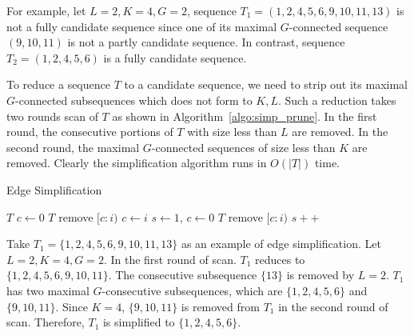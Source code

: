 For example, let $L = 2, K = 4, G = 2$, sequence $T_1=(1,2,4,5,6,9,10,11,13)$ is 
not a fully candidate sequence since one of its maximal $G$-connected sequence $(9,10,11)$
is not a partly candidate sequence. In contrast, sequence $T_2=(1,2,4,5,6)$ is 
a fully candidate sequence.

To reduce a sequence $T$ to a candidate sequence, we need to strip out its 
maximal $G$-connected subsequences which does not form to $K,L$. Such a reduction
takes two rounds scan of $T$ as shown in Algorithm~\ref{algo:simp_prune}. In the 
first round, the consecutive portions of $T$ with size less than $L$ are removed.
In the second round, the maximal $G$-connected sequences of size less than $K$ are
removed. Clearly the simplification algorithm runs in $O(|T|)$ time.
\begin{algorithm}
\caption{Edge Simplification}
\label{algo:simp_prune}
\begin{algorithmic}[1]
\Require $T$
\State $c \gets 0$
			\State $T$ remove $[c:i)$
		\EndIf
		\State $c \gets i$
	\EndIf
\EndFor
{}
\State $s\gets 1$, $c\gets 0$
			\State $T$ remove $[c:i)$
		\EndIf
	\Else
		\State $s++$
	\EndIf
\EndFor
\end{algorithmic}
\end{algorithm}

\begin{example}
Take $T_1=\{1,2,4,5,6,9,10,11,13\}$ as an example of edge simplification. Let $L = 2, K = 4, G = 2$.
In the first round of scan. $T_1$ reduces to $\{1,2,4,5,6,9,10,11\}$. The consecutive subsequence $\{13\}$
is removed by $L=2$. $T_1$ has two maximal $G$-consecutive subsequences, which 
are $\{1,2,4,5,6\}$ and $\{9,10,11\}$. Since $K=4$, $\{9,10,11\}$ is removed
from $T_1$ in the second round of scan. Therefore, $T_1$ is simplified to $\{1,2,4,5,6\}$.
\end{example}

%


